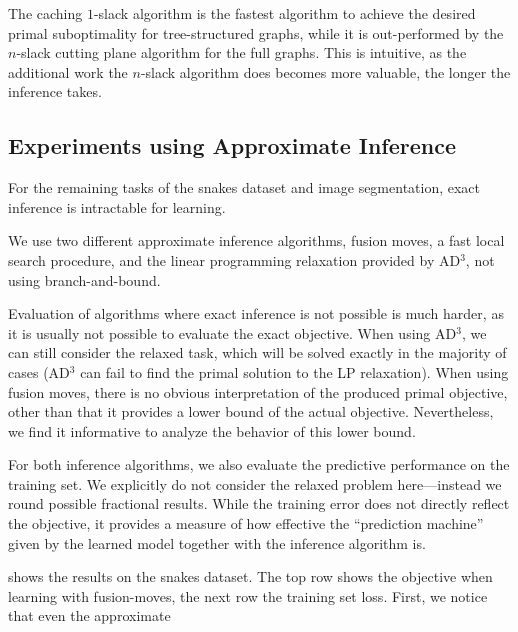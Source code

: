 The caching $1$-slack algorithm is the fastest algorithm to achieve the desired
primal suboptimality for tree-structured graphs, while it is out-performed by
the $n$-slack cutting plane algorithm for the full graphs. This is intuitive,
as the additional work the $n$-slack algorithm does becomes more valuable, the
longer the inference takes. 



\subsection{Experiments using Approximate Inference}
For the remaining tasks of the snakes dataset and image segmentation, exact
inference is intractable for learning.

We use two different approximate inference algorithms, fusion moves, a fast
local search procedure, and the linear programming relaxation provided by AD$^3$,
not using branch-and-bound.

Evaluation of algorithms where exact inference is not possible is much harder,
as it is usually not possible to evaluate the exact objective. When using AD$^3$,
we can still consider the relaxed task, which will be solved exactly in the
majority of cases (AD$^3$ can fail to find the primal solution to the LP
relaxation).
When using fusion moves, there is no obvious interpretation of the produced
primal objective, other than that it provides a lower bound of the actual
objective. Nevertheless, we find it informative to analyze the behavior of this
lower bound.

For both inference algorithms, we also evaluate the predictive performance on
the training set.  We explicitly do not consider the relaxed problem
here---instead we round possible fractional results. While the training error
does not directly reflect the objective, it provides a measure of how effective
the ``prediction machine'' given by the learned model together with the
inference algorithm is.

 shows the results on the snakes dataset.
The top row shows the objective when learning with fusion-moves, the next row the training set loss.
First, we notice that even the approximate 

